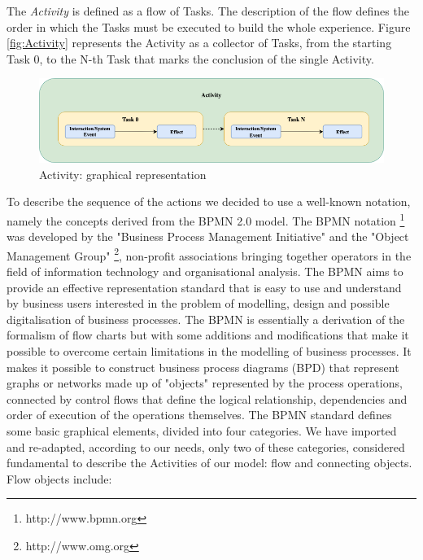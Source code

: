 The \emph{Activity} is defined as a flow of Tasks. The description of the flow defines the order in which the Tasks must be executed to build the whole experience. Figure \autoref{fig:Activity} represents the Activity as a collector of Tasks, from the starting Task 0, to the N-th Task that marks the conclusion of the single Activity. 
\begin{figure}[h]
	\centering
	\includegraphics[width=13cm]{Figures/Conceptual Model/Activity.png}
	\caption{Activity: graphical representation}
	\label{fig:Activity}
\end{figure}
To describe the sequence of the actions we decided to use a well-known notation, namely the concepts derived from the BPMN 2.0 model.
The BPMN notation \footnote{http://www.bpmn.org} was developed by the "Business Process Management Initiative" and the "Object Management Group" \footnote{http://www.omg.org}, non-profit associations bringing together operators in the field of information technology and organisational analysis. The BPMN aims to provide an effective representation standard that is easy to use and understand by business users interested in the problem of modelling, design and possible digitalisation of business processes.
The BPMN is essentially a derivation of the formalism of flow charts but with some additions and modifications that make it possible to overcome certain limitations in the modelling of business processes. It makes it possible to construct business process diagrams (BPD) that represent graphs or networks made up of "objects" represented by the process operations, connected by control flows that define the logical relationship, dependencies and order of execution of the operations themselves. 
The BPMN standard defines some basic graphical elements, divided into four categories. We have imported and re-adapted, according to our needs, only two of these categories, considered fundamental to describe the Activities of our model: flow and connecting objects. Flow objects include:
